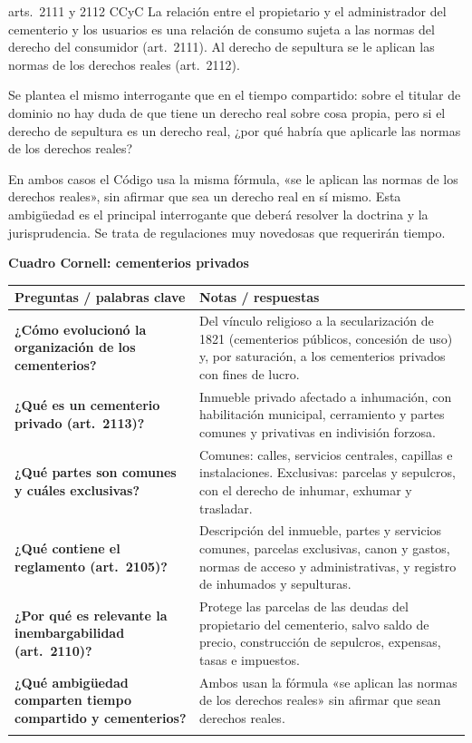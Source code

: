 \documentclass[12pt,oneside]{book}
\renewcommand{\arraystretch}{1.25}
\newcommand{\cq}[2]{\textbf{#1} & #2 \\[0.45em]}
\newcommand{\cornell}[3]{%
\par\bigskip\noindent\textbf{\large Cuadro Cornell: #1}\par\smallskip
\begin{center}
\small
\renewcommand{\arraystretch}{1.15}
\begin{tabularx}{\textwidth}{>{\raggedright\arraybackslash}p{0.27\textwidth}>{\raggedright\arraybackslash}X}
\toprule
\textbf{Preguntas / palabras clave} & \textbf{Notas / respuestas} \\
\midrule
#2
\midrule
\multicolumn{2}{p{\dimexpr\textwidth-2\tabcolsep\relax}}{\textbf{Resumen.} #3} \\
\bottomrule
\end{tabularx}
\end{center}
}
\begin{document}
\begin{regla}{arts.~2111 y 2112 CCyC}
La relación entre el propietario y el administrador del cementerio y los usuarios es una relación de consumo sujeta a las normas del derecho del consumidor (art.~2111). Al derecho de sepultura se le aplican las normas de los derechos reales (art.~2112).
\end{regla}

Se plantea el mismo interrogante que en el tiempo compartido: sobre el titular de dominio no hay duda de que tiene un derecho real sobre cosa propia, pero si el derecho de sepultura es un derecho real, ¿por qué habría que aplicarle las normas de los derechos reales?

\begin{importante}
En ambos casos el Código usa la misma fórmula, «se le aplican las normas de los derechos reales», sin afirmar que sea un derecho real en sí mismo. Esta ambigüedad es el principal interrogante que deberá resolver la doctrina y la jurisprudencia. Se trata de regulaciones muy novedosas que requerirán tiempo.
\end{importante}

\cornell{cementerios privados}{
\cq{¿Cómo evolucionó la organización de los cementerios?}{Del vínculo religioso a la secularización de 1821 (cementerios públicos, concesión de uso) y, por saturación, a los cementerios privados con fines de lucro.}
\cq{¿Qué es un cementerio privado (art.~2113)?}{Inmueble privado afectado a inhumación, con habilitación municipal, cerramiento y partes comunes y privativas en indivisión forzosa.}
\cq{¿Qué partes son comunes y cuáles exclusivas?}{Comunes: calles, servicios centrales, capillas e instalaciones. Exclusivas: parcelas y sepulcros, con el derecho de inhumar, exhumar y trasladar.}
\cq{¿Qué contiene el reglamento (art.~2105)?}{Descripción del inmueble, partes y servicios comunes, parcelas exclusivas, canon y gastos, normas de acceso y administrativas, y registro de inhumados y sepulturas.}
\cq{¿Por qué es relevante la inembargabilidad (art.~2110)?}{Protege las parcelas de las deudas del propietario del cementerio, salvo saldo de precio, construcción de sepulcros, expensas, tasas e impuestos.}
\cq{¿Qué ambigüedad comparten tiempo compartido y cementerios?}{Ambos usan la fórmula «se aplican las normas de los derechos reales» sin afirmar que sean derechos reales.}
}{El cementerio privado es un inmueble afectado a la inhumación, con partes comunes en indivisión forzosa y parcelas exclusivas inembargables, bajo poder de policía mortuoria estatal y normas de consumo. Como el tiempo compartido, plantea el interrogante de si es un derecho real o solo se le aplican sus normas.}
\end{document}
